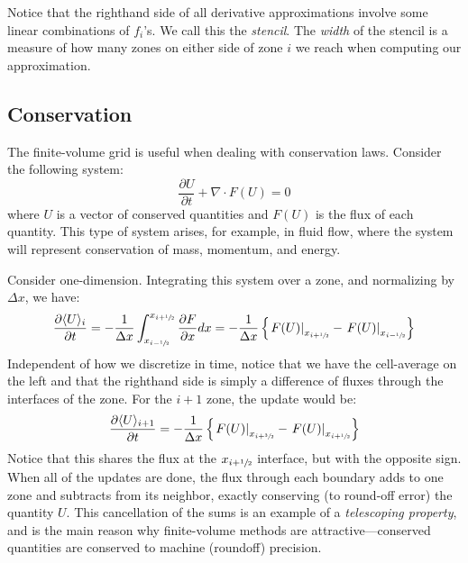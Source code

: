 Notice that the righthand side of all derivative approximations involve
some linear combinations of $f_i$'s.  We call this the {\em stencil}.
The {\em width} of the stencil is a measure of how many zones on
either side of zone $i$ we reach when computing our approximation.

\subsection{Conservation}

The finite-volume grid is useful when dealing with conservation laws.
Consider the following system:
\begin{equation}
\frac{\partial U}{\partial t} + \nabla \cdot F(U) = 0
\end{equation}
where $U$ is a vector of conserved quantities and $F(U)$ is the flux
of each quantity.  This type of system arises, for example, in fluid
flow, where the system will represent conservation of mass, momentum,
and energy.

Consider one-dimension.
Integrating this system over a zone, and normalizing by $\Delta x$, we have:
\begin{equation}
\frac{\partial \langle U\rangle_i}{\partial t} =
  -\frac{1}{\Delta x} \int_{x_{i-\sfrac{1}{2}}}^{x_{i+\sfrac{1}{2}}} \frac{\partial F}{\partial x} dx =
  - \frac{1}{\Delta x} \left \{ \left . F(U) \right |_{x_{i+\sfrac{1}{2}}} -
                                \left . F(U) \right |_{x_{i-\sfrac{1}{2}}} \right \}
\end{equation}
Independent of how we discretize in time, notice that we have the cell-average
on the left and that the righthand side
is simply a difference of fluxes through the interfaces of the zone.
For the $i+1$ zone, the update would be:
\begin{equation}
\label{eq:consup}
\frac{\partial \langle U\rangle_{i+1}}{\partial t} =
  - \frac{1}{\Delta x} \left \{ \left . F(U) \right |_{x_{i+\sfrac{3}{2}}} -
                                \left . F(U) \right |_{x_{i+\sfrac{1}{2}}} \right \}
\end{equation}
Notice that this shares the flux at the $x_{i+\sfrac{1}{2}}$ interface, but with the
opposite sign.  When all of the updates are done, the flux through each
boundary adds to one zone and subtracts from its neighbor, exactly conserving
(to round-off error) the quantity $U$.  This cancellation of the sums
is an example of a {\em telescoping property}, and is the main reason
why finite-volume methods are attractive---conserved quantities are
conserved to machine (roundoff) precision.

